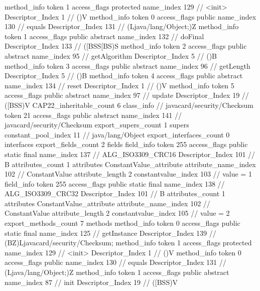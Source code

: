 {{{{{				}
				method_info {
					token	1
					access_flags	protected
					name_index	129		// <init>
					Descriptor_Index	1		// ()V
				}
				method_info {
					token	0
					access_flags	public
					name_index	130		// equals
					Descriptor_Index	131		// (Ljava/lang/Object;)Z
				}
				method_info {
					token	1
					access_flags	public abstract
					name_index	132		// doFinal
					Descriptor_Index	133		// ([BSS[BS)S
				}
				method_info {
					token	2
					access_flags	public abstract
					name_index	95		// getAlgorithm
					Descriptor_Index	5		// ()B
				}
				method_info {
					token	3
					access_flags	public abstract
					name_index	96		// getLength
					Descriptor_Index	5		// ()B
				}
				method_info {
					token	4
					access_flags	public abstract
					name_index	134		// reset
					Descriptor_Index	1		// ()V
				}
				method_info {
					token	5
					access_flags	public abstract
					name_index	97		// update
					Descriptor_Index	19		// ([BSS)V
				}
			}
			CAP22_inheritable_count	6
		}
		class_info {		// javacard/security/Checksum
			token	21
			access_flags	public abstract
			name_index	141		// javacard/security/Checksum
			export_supers_count	1
			supers {
				constant_pool_index	11		// java/lang/Object
			}
			export_interfaces_count	0
			interfaces {
			}
			export_fields_count	2
			fields {
			field_info {
				token	255
				access_flags	public static final
				name_index	137		// ALG_ISO3309_CRC16
				Descriptor_Index	101		// B
				attributes_count	1
				attributes {
				ConstantValue_attribute {
					attribute_name_index	102		// ConstantValue
					attribute_length	2
					constantvalue_index	103		// value = 1
				}
				}
			}
			field_info {
				token	255
				access_flags	public static final
				name_index	138		// ALG_ISO3309_CRC32
				Descriptor_Index	101		// B
				attributes_count	1
				attributes {
				ConstantValue_attribute {
					attribute_name_index	102		// ConstantValue
					attribute_length	2
					constantvalue_index	105		// value = 2
				}
				}
			}
			}
			export_methods_count	7
			methods {
				method_info {
					token	0
					access_flags	public static final
					name_index	125		// getInstance
					Descriptor_Index	139		// (BZ)Ljavacard/security/Checksum;
				}
				method_info {
					token	1
					access_flags	protected
					name_index	129		// <init>
					Descriptor_Index	1		// ()V
				}
				method_info {
					token	0
					access_flags	public
					name_index	130		// equals
					Descriptor_Index	131		// (Ljava/lang/Object;)Z
				}
				method_info {
					token	1
					access_flags	public abstract
					name_index	87		// init
					Descriptor_Index	19		// ([BSS)V
}}}}}
